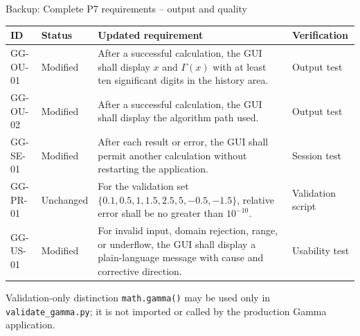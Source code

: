 \documentclass[10pt,aspectratio=169]{beamer}
\newcommand{\smallnote}[1]{\vspace{0.2em}{\scriptsize\textcolor{linegray}{#1}}}
\newcommand{\statusmodified}{\textcolor{softorange}{Modified}}
\newcommand{\statussame}{\textcolor{linegray}{Unchanged}}
\begin{document}
\begin{frame}{Backup: Complete P7 requirements -- output and quality}
\tiny
\renewcommand{\arraystretch}{1.12}
\begin{tabularx}{\textwidth}{>{\ttfamily}p{1.4cm}p{1.25cm}X p{1.55cm}}
\toprule
ID & Status & Updated requirement & Verification \\
\midrule
GG-OU-01 & \statusmodified & After a successful calculation, the GUI shall display $x$ and $\Gamma(x)$ with at least ten significant digits in the history area. & Output test \\
GG-OU-02 & \statusmodified & After a successful calculation, the GUI shall display the algorithm path used. & Output test \\
GG-SE-01 & \statusmodified & After each result or error, the GUI shall permit another calculation without restarting the application. & Session test \\
GG-PR-01 & \statussame & For the validation set $\{0.1,0.5,1,1.5,2.5,5,-0.5,-1.5\}$, relative error shall be no greater than $10^{-10}$. & Validation script \\
GG-US-01 & \statusmodified & For invalid input, domain rejection, range, or underflow, the GUI shall display a plain-language message with cause and corrective direction. & Usability test \\
\bottomrule
\end{tabularx}
\vspace{0.6em}
\begin{block}{Validation-only distinction}
\scriptsize
\texttt{math.gamma()} may be used only in \texttt{validate\_gamma.py}; it is not imported or called by the production Gamma application.
\end{block}
\vfill\smallnote{Sources: [1], [2], [5].}
\end{frame}
\end{document}
